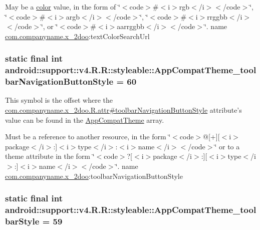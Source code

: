 May be a \hyperlink{classandroid_1_1support_1_1v4_1_1_r_1_1color}{color} value, in the form of \char`\"{}$<$code$>$\#$<$i$>$rgb$<$/i$>$$<$/code$>$\char`\"{}, \char`\"{}$<$code$>$\#$<$i$>$argb$<$/i$>$$<$/code$>$\char`\"{}, \char`\"{}$<$code$>$\#$<$i$>$rrggbb$<$/i$>$$<$/code$>$\char`\"{}, or \char`\"{}$<$code$>$\#$<$i$>$aarrggbb$<$/i$>$$<$/code$>$\char`\"{}.  name \hyperlink{namespacecom_1_1companyname_1_1x__2doo}{com.companyname.x\_\-2doo}:textColorSearchUrl \hypertarget{classandroid_1_1support_1_1v4_1_1_r_1_1styleable_87064f8d46222440c979de60d377ca13}{
\subsubsection[{AppCompatTheme\_\-toolbarNavigationButtonStyle}]{\setlength{\rightskip}{0pt plus 5cm}static final int android::support::v4.R.R::styleable::AppCompatTheme\_\-toolbarNavigationButtonStyle = 60}}
\label{classandroid_1_1support_1_1v4_1_1_r_1_1styleable_87064f8d46222440c979de60d377ca13}


This symbol is the offset where the \hyperlink{classcom_1_1companyname_1_1x__2doo_1_1_r_1_1attr_80b08220a3c645e21c79e7965119576e}{com.companyname.x\_\-2doo.R.attr\#toolbarNavigationButtonStyle} attribute's value can be found in the \hyperlink{classandroid_1_1support_1_1v4_1_1_r_1_1styleable_0873e92ba21076bb5a4aeadeb7f5779f}{AppCompatTheme} array.

Must be a reference to another resource, in the form \char`\"{}$<$code$>$@\mbox{[}+\mbox{]}\mbox{[}$<$i$>$package$<$/i$>$:\mbox{]}$<$i$>$type$<$/i$>$:$<$i$>$name$<$/i$>$$<$/code$>$\char`\"{} or to a theme attribute in the form \char`\"{}$<$code$>$?\mbox{[}$<$i$>$package$<$/i$>$:\mbox{]}\mbox{[}$<$i$>$type$<$/i$>$:\mbox{]}$<$i$>$name$<$/i$>$$<$/code$>$\char`\"{}.  name \hyperlink{namespacecom_1_1companyname_1_1x__2doo}{com.companyname.x\_\-2doo}:toolbarNavigationButtonStyle \hypertarget{classandroid_1_1support_1_1v4_1_1_r_1_1styleable_81c6c79a79be93a353a8d86869ec3c42}{
\subsubsection[{AppCompatTheme\_\-toolbarStyle}]{\setlength{\rightskip}{0pt plus 5cm}static final int android::support::v4.R.R::styleable::AppCompatTheme\_\-toolbarStyle = 59}}
\label{classandroid_1_1support_1_1v4_1_1_r_1_1styleable_81c6c79a79be93a353a8d86869ec3c42}


